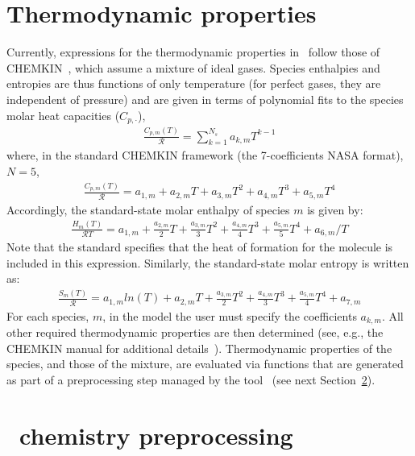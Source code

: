 \section{Thermodynamic properties}
\label{ThermoProp}
Currently, expressions for the thermodynamic properties in \pelelm\ follow those of CHEMKIN~\cite{Kee:1989}, which assume a mixture of ideal gases. Species enthalpies and entropies are thus functions of only temperature (for perfect gases, they are independent of pressure) and are given in terms of polynomial fits to the species molar heat capacities ($C_{p,\cdot}$),
\begin{eqnarray*}
\frac{C_{p,m}(T)}{\mathcal{R}} = \sum_{k=1}^{N_s} a_{k,m}T^{k-1}
\end{eqnarray*}
where, in the standard CHEMKIN framework (the 7-coefficients NASA format), $N =5$,
\begin{eqnarray}
\frac{C_{p,m}(T)}{\mathcal{R}} = a_{1,m} + a_{2,m} T + a_{3,m} T^2 + a_{4,m} T^3 + a_{5,m} T^4
\end{eqnarray}
Accordingly, the standard-state molar enthalpy of species $m$ is given by:
\begin{eqnarray}
\frac{H_{m}(T)}{\mathcal{R}T} = a_{1,m} +\frac{a_{2,m}}{2} T   + \frac{a_{3,m}}{3} T^2 +  \frac{a_{4,m}}{4} T^3 + \frac{ a_{5,m}}{5} T^4 + a_{6,m}/T
\end{eqnarray}
Note that the standard specifies that the heat of formation for the molecule is included in this expression.
Similarly, the standard-state molar entropy is written as:
\begin{eqnarray}
\frac{S_{m}(T)}{\mathcal{R}} = a_{1,m}ln(T) + {a_{2,m}} T   + \frac{a_{3,m}}{2} T^2 +  \frac{a_{4,m}}{3} T^3 + \frac{ a_{5,m}}{4} T^4 + a_{7,m}
\end{eqnarray}
For each species, $m$, in the model the user must specify the coefficients $a_{k,m}$. All other required thermodynamic properties are then determined (see, e.g., the CHEMKIN manual for additional details~\cite{Kee:1989}). Thermodynamic properties of the species, and those of the mixture, are evaluated via functions that are generated as part of a preprocessing step managed by the tool \fuego\ (see next Section~\ref{FuegoDescr}).


\section{\fuego\ chemistry preprocessing}
\label{FuegoDescr}

